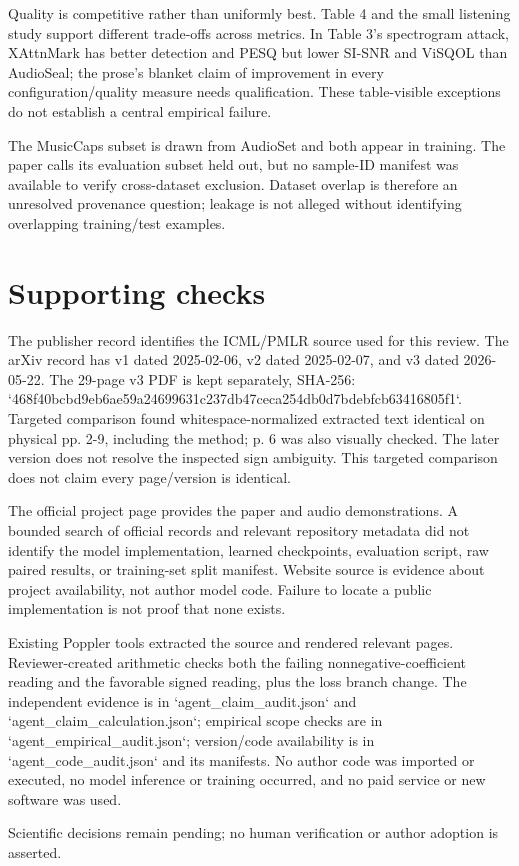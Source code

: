 \documentclass[10pt]{article}
\begin{document}
Quality is competitive rather than uniformly best. Table 4 and the small listening study support different trade-offs across metrics. In Table 3’s spectrogram attack, XAttnMark has better detection and PESQ but lower SI-SNR and ViSQOL than AudioSeal; the prose’s blanket claim of improvement in every configuration/quality measure needs qualification. These table-visible exceptions do not establish a central empirical failure.\par
The MusicCaps subset is drawn from AudioSet and both appear in training. The paper calls its evaluation subset held out, but no sample-ID manifest was available to verify cross-dataset exclusion. Dataset overlap is therefore an unresolved provenance question; leakage is not alleged without identifying overlapping training/test examples.\par
\section*{Supporting checks}
The publisher record identifies the ICML/PMLR source used for this review. The arXiv record has v1 dated 2025-02-06, v2 dated 2025-02-07, and v3 dated 2026-05-22. The 29-page v3 PDF is kept separately, SHA-256: `468f40bcbd9eb6ae59a24699631c237db47ceca254db0d7bdebfcb63416805f1`. Targeted comparison found whitespace-normalized extracted text identical on physical pp. 2-9, including the method; p. 6 was also visually checked. The later version does not resolve the inspected sign ambiguity. This targeted comparison does not claim every page/version is identical.\par
The official project page provides the paper and audio demonstrations. A bounded search of official records and relevant repository metadata did not identify the model implementation, learned checkpoints, evaluation script, raw paired results, or training-set split manifest. Website source is evidence about project availability, not author model code. Failure to locate a public implementation is not proof that none exists.\par
Existing Poppler tools extracted the source and rendered relevant pages. Reviewer-created arithmetic checks both the failing nonnegative-coefficient reading and the favorable signed reading, plus the loss branch change. The independent evidence is in `agent\_claim\_audit.json` and `agent\_claim\_calculation.json`; empirical scope checks are in `agent\_empirical\_audit.json`; version/code availability is in `agent\_code\_audit.json` and its manifests. No author code was imported or executed, no model inference or training occurred, and no paid service or new software was used.\par
Scientific decisions remain pending; no human verification or author adoption is asserted.\par
\end{document}
